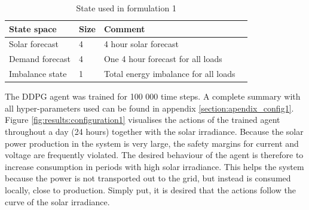 \documentclass[class=book, crop=false]{standalone}
\begin{document}
\begin{table}[ht]
\centering
\begin{tabular}{l|lll}

State space  & Size & Comment
\\ 
\hline
Solar forecast      &  4  &  4 hour solar forecast
\\ 

Demand forecast    &4 & One 4 hour forecast for all loads
\\ 
Imbalance state & 1  & Total energy imbalance for all loads
\\
\hline
\end{tabular}
\caption{State used in formulation 1}
\label{table:results:state_formulation1}
\end{table}
The DDPG agent was trained for 100 000 time steps. A complete summary with all hyper-parameters used can be found in appendix \ref{section:apendix_config1}. Figure \ref{fig:results:configuration1} visualises the actions of the trained agent throughout a day (24 hours) together with the solar irradiance. Because the solar power production in the system is very large, the safety margins for current and voltage are frequently violated. The desired behaviour of the agent is therefore to increase consumption in periods with high solar irradiance. This helps the system because the power is not transported out to the grid, but instead is consumed locally, close to production. Simply put, it is desired that the actions follow the curve of the solar irradiance. 
\end{document}
